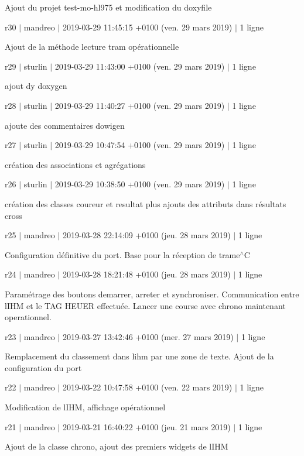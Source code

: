 Ajout du projet test-\/mo-\/hl975 et modification du doxyfile

r30 $\vert$ mandreo $\vert$ 2019-\/03-\/29 11\+:45\+:15 +0100 (ven. 29 mars 2019) $\vert$ 1 ligne

Ajout de la méthode lecture tram opérationnelle

r29 $\vert$ sturlin $\vert$ 2019-\/03-\/29 11\+:43\+:00 +0100 (ven. 29 mars 2019) $\vert$ 1 ligne

ajout dy doxygen

r28 $\vert$ sturlin $\vert$ 2019-\/03-\/29 11\+:40\+:27 +0100 (ven. 29 mars 2019) $\vert$ 1 ligne

ajoute des commentaires dowigen

r27 $\vert$ sturlin $\vert$ 2019-\/03-\/29 10\+:47\+:54 +0100 (ven. 29 mars 2019) $\vert$ 1 ligne

création des associations et agrégations

r26 $\vert$ sturlin $\vert$ 2019-\/03-\/29 10\+:38\+:50 +0100 (ven. 29 mars 2019) $\vert$ 1 ligne

création des classes coureur et resultat plus ajouts des attributs dans résultats cross

r25 $\vert$ mandreo $\vert$ 2019-\/03-\/28 22\+:14\+:09 +0100 (jeu. 28 mars 2019) $\vert$ 1 ligne

Configuration définitive du port. Base pour la réception de trame$^\wedge$C

r24 $\vert$ mandreo $\vert$ 2019-\/03-\/28 18\+:21\+:48 +0100 (jeu. 28 mars 2019) $\vert$ 1 ligne

Paramétrage des boutons demarrer, arreter et synchroniser. Communication entre l\textquotesingle{}I\+HM et le T\+AG H\+E\+U\+ER effectuée. Lancer une course avec chrono maintenant operationnel.

r23 $\vert$ mandreo $\vert$ 2019-\/03-\/27 13\+:42\+:46 +0100 (mer. 27 mars 2019) $\vert$ 1 ligne

Remplacement du classement dans l\textquotesingle{}ihm par une zone de texte. Ajout de la configuration du port

r22 $\vert$ mandreo $\vert$ 2019-\/03-\/22 10\+:47\+:58 +0100 (ven. 22 mars 2019) $\vert$ 1 ligne

Modification de l\textquotesingle{}I\+HM, affichage opérationnel

r21 $\vert$ mandreo $\vert$ 2019-\/03-\/21 16\+:40\+:22 +0100 (jeu. 21 mars 2019) $\vert$ 1 ligne

Ajout de la classe chrono, ajout des premiers widgets de l\textquotesingle{}I\+HM

